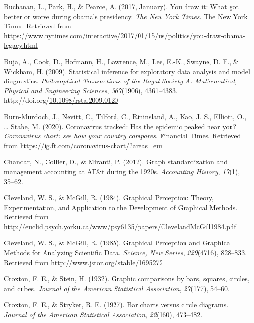 \documentclass[print]{nuthesis}
\newlength{\cslhangindent}
\newenvironment{CSLReferences}%
{\setlength{\parindent}{0pt}%
\everypar{\setlength{\hangindent}{\cslhangindent}}\ignorespaces}%
{\par}
\begin{document}
\begin{CSLReferences}{1}{0}
\leavevmode\hypertarget{ref-buchanan_park_pearce_2017}{}%
Buchanan, L., Park, H., \& Pearce, A. (2017, January). You draw it: What got better or worse during obama's presidency. \emph{The New York Times}. The New York Times. Retrieved from \url{https://www.nytimes.com/interactive/2017/01/15/us/politics/you-draw-obama-legacy.html}

\leavevmode\hypertarget{ref-buja_statistical_2009}{}%
Buja, A., Cook, D., Hofmann, H., Lawrence, M., Lee, E.-K., Swayne, D. F., \& Wickham, H. (2009). Statistical inference for exploratory data analysis and model diagnostics. \emph{Philosophical Transactions of the Royal Society A: Mathematical, Physical and Engineering Sciences}, \emph{367}(1906), 4361--4383. http://doi.org/\href{https://doi.org/10.1098/rsta.2009.0120}{10.1098/rsta.2009.0120}

\leavevmode\hypertarget{ref-burnmurdoch_2020}{}%
Burn-Murdoch, J., Nevitt, C., Tilford, C., Rininsland, A., Kao, J. S., Elliott, O., \ldots{} Stabe, M. (2020). Coronavirus tracked: Has the epidemic peaked near you? \emph{Coronavirus chart: see how your country compares}. Financial Times. Retrieved from \url{https://ig.ft.com/coronavirus-chart/?areas=eur}

\leavevmode\hypertarget{ref-chandar2012graph}{}%
Chandar, N., Collier, D., \& Miranti, P. (2012). Graph standardization and management accounting at AT\&t during the 1920s. \emph{Accounting History}, \emph{17}(1), 35--62.

\leavevmode\hypertarget{ref-cleveland_graphical_1984}{}%
Cleveland, W. S., \& McGill, R. (1984). Graphical {Perception}: {Theory}, {Experimentation}, and {Application} to the {Development} of {Graphical} {Methods}. Retrieved from \url{http://euclid.psych.yorku.ca/www/psy6135/papers/ClevelandMcGill1984.pdf}

\leavevmode\hypertarget{ref-cleveland_graphical_1985}{}%
Cleveland, W. S., \& McGill, R. (1985). Graphical {Perception} and {Graphical} {Methods} for {Analyzing} {Scientific} {Data}. \emph{Science, New Series}, \emph{229}(4716), 828--833. Retrieved from \url{http://www.jstor.org/stable/1695272}

\leavevmode\hypertarget{ref-croxton1932graphic}{}%
Croxton, F. E., \& Stein, H. (1932). Graphic comparisons by bars, squares, circles, and cubes. \emph{Journal of the American Statistical Association}, \emph{27}(177), 54--60.

\leavevmode\hypertarget{ref-croxton1927bar}{}%
Croxton, F. E., \& Stryker, R. E. (1927). Bar charts versus circle diagrams. \emph{Journal of the American Statistical Association}, \emph{22}(160), 473--482.


\end{CSLReferences}
\end{document}
